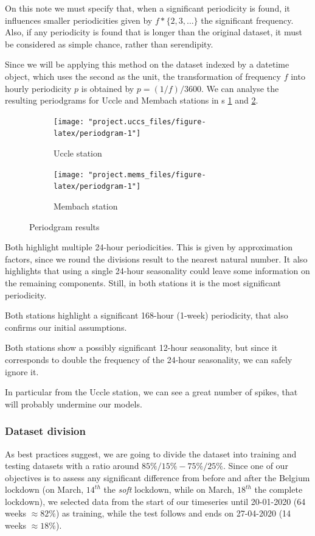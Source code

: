 \documentclass[12pt]{article}
\begin{document}
On this note we must specify that, when a significant periodicity is found, it influences smaller periodicities given by $f*\{2,3,\dots\}$ the significant frequency. Also, if any periodicity is found that is longer than the original dataset, it must be considered as simple chance, rather than serendipity.

Since we will be applying this method on the dataset indexed by a datetime object, which uses the second as the unit, the transformation of frequency $f$ into hourly periodicity $p$ is obtained by $p=(1/f)/3600$.
We can analyse the resulting periodgrams for Uccle and Membach stations in \figurename{s} \ref{fig:periodgram:uccs} and \ref{fig:periodgram:mems}.

\begin{figure}[h]
	\begin{subfigure}{.5\linewidth}
		\texttt{[image: "project.uccs\_files/figure-latex/periodgram-1"]}
		\caption{Uccle station}
		\label{fig:periodgram:uccs}
	\end{subfigure}
	\begin{subfigure}{.5\linewidth}
		\texttt{[image: "project.mems\_files/figure-latex/periodgram-1"]}
		\caption{Membach station}
		\label{fig:periodgram:mems}
	\end{subfigure}
	\caption{Periodgram results}
	\label{fig:periodgram}
\end{figure}

Both highlight multiple 24-hour periodicities. This is given by approximation factors, since we round the divisions result to the nearest natural number. It also highlights that using a single 24-hour seasonality could leave some information on the remaining components. Still, in both stations it is the most significant periodicity.

Both stations highlight a significant 168-hour (1-week) periodicity, that also confirms our initial assumptions.

Both stations show a possibly significant 12-hour seasonality, but since it corresponds to double the frequency of the 24-hour seasonality, we can safely ignore it.

In particular from the Uccle station, we can see a great number of spikes, that will probably undermine our models.


\subsubsection{Dataset division}
As best practices suggest, we are going to divide the dataset into training and testing datasets with a ratio around $85\%/15\% - 75\%/25\%$.
Since one of our objectives is to assess any significant difference from before and after the Belgium lockdown (on March, $14^{th}$ the \textit{soft} lockdown, while on March, $18^{th}$ the complete lockdown), we selected data from the start of our timeseries until 20-01-2020 (64 weeks $\approx 82\%$) as training, while the test follows and ends on 27-04-2020 (14 weeks $\approx 18\%$).
\end{document}
